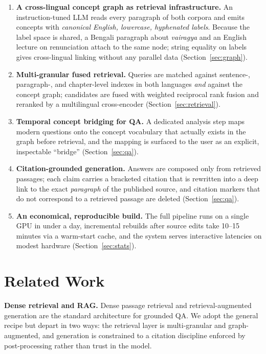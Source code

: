 \documentclass[11pt,a4paper]{article}
\begin{document}
\begin{enumerate}[leftmargin=1.4em]
  \item \textbf{A cross-lingual concept graph as retrieval
  infrastructure.} An instruction-tuned LLM reads every paragraph of both
  corpora and emits concepts with \emph{canonical English, lowercase,
  hyphenated labels}. Because the label space is shared, a Bengali
  paragraph about \emph{vairagya} and an English lecture on renunciation
  attach to the same node; string equality on labels gives cross-lingual
  linking without any parallel data (Section~\ref{sec:graph}).
  \item \textbf{Multi-granular fused retrieval.} Queries are matched
  against sentence-, paragraph-, and chapter-level indexes in both
  languages \emph{and} against the concept graph; candidates are fused
  with weighted reciprocal rank fusion \cite{cormack2009rrf} and reranked
  by a multilingual cross-encoder (Section~\ref{sec:retrieval}).
  \item \textbf{Temporal concept bridging for QA.} A dedicated analysis
  step maps modern questions onto the concept vocabulary that actually
  exists in the graph before retrieval, and the mapping is surfaced to
  the user as an explicit, inspectable ``bridge''
  (Section~\ref{sec:qa}).
  \item \textbf{Citation-grounded generation.} Answers are composed only
  from retrieved passages; each claim carries a bracketed citation that
  is rewritten into a deep link to the exact \emph{paragraph} of the
  published source, and citation markers that do not correspond to a
  retrieved passage are deleted (Section~\ref{sec:qa}).
  \item \textbf{An economical, reproducible build.} The full pipeline
  runs on a single GPU in under a day, incremental rebuilds after source
  edits take 10--15 minutes via a warm-start cache, and the system serves
  interactive latencies on modest hardware (Section~\ref{sec:stats}).
\end{enumerate}

\section{Related Work}

\textbf{Dense retrieval and RAG.} Dense passage retrieval
\cite{karpukhin2020dpr} and retrieval-augmented generation
\cite{lewis2020rag,gao2023ragsurvey} are the standard architecture for
grounded QA. We adopt the general recipe but depart in two ways: the
retrieval layer is multi-granular and graph-augmented, and generation is
constrained to a citation discipline enforced by post-processing rather
than trust in the model.
\end{document}
